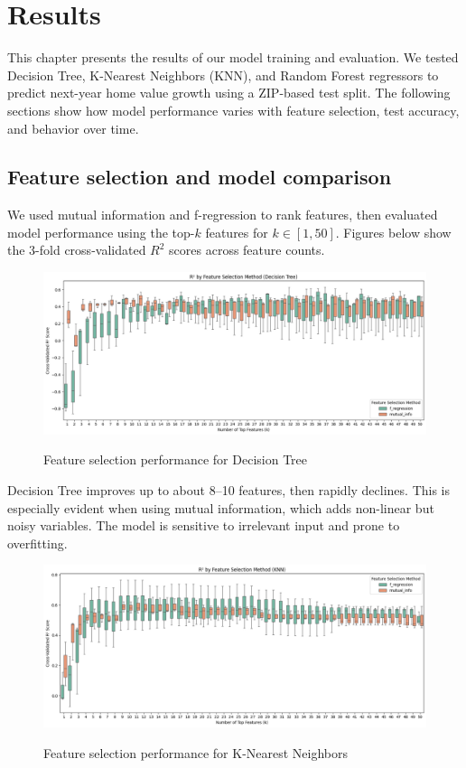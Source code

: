 \chapter{Results}
\label{ch:results}

This chapter presents the results of our model training and evaluation. We tested Decision Tree, K-Nearest Neighbors (KNN), and Random Forest regressors to predict next-year home value growth using a ZIP-based test split. The following sections show how model performance varies with feature selection, test accuracy, and behavior over time.

\section{Feature selection and model comparison}

We used mutual information and f-regression to rank features, then evaluated model performance using the top-$k$ features for $k \in [1, 50]$. Figures below show the 3-fold cross-validated $R^2$ scores across feature counts.

\begin{figure}[!ht]
    \centering
    \includegraphics[width=\textwidth]{figures/box50_DT.png}
    \caption{Feature selection performance for Decision Tree}
    \caption*{\hspace{1em}}
    \label{fig:box_dt}
\end{figure}
\FloatBarrier

Decision Tree improves up to about 8–10 features, then rapidly declines. This is especially evident when using mutual information, which adds non-linear but noisy variables. The model is sensitive to irrelevant input and prone to overfitting.

\begin{figure}[!ht]
    \centering
    \includegraphics[width=\textwidth]{figures/box50_KNN.png}
    \caption{Feature selection performance for K-Nearest Neighbors}
    \caption*{\hspace{1em}}
    \label{fig:box_knn}
\end{figure}
\FloatBarrier

